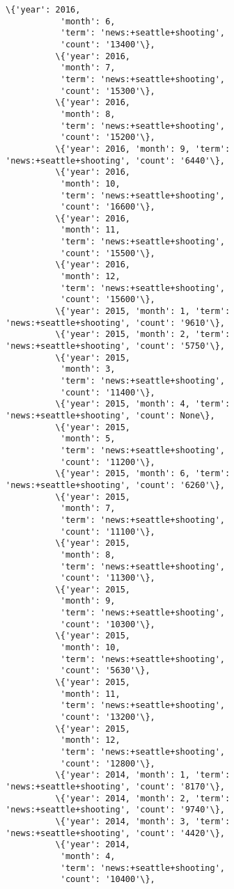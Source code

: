 \documentclass[11pt]{article}
\begin{document}
\begin{Verbatim}[commandchars=\\\{\}]
          \{'year': 2016,
           'month': 6,
           'term': 'news:+seattle+shooting',
           'count': '13400'\},
          \{'year': 2016,
           'month': 7,
           'term': 'news:+seattle+shooting',
           'count': '15300'\},
          \{'year': 2016,
           'month': 8,
           'term': 'news:+seattle+shooting',
           'count': '15200'\},
          \{'year': 2016, 'month': 9, 'term': 'news:+seattle+shooting', 'count': '6440'\},
          \{'year': 2016,
           'month': 10,
           'term': 'news:+seattle+shooting',
           'count': '16600'\},
          \{'year': 2016,
           'month': 11,
           'term': 'news:+seattle+shooting',
           'count': '15500'\},
          \{'year': 2016,
           'month': 12,
           'term': 'news:+seattle+shooting',
           'count': '15600'\},
          \{'year': 2015, 'month': 1, 'term': 'news:+seattle+shooting', 'count': '9610'\},
          \{'year': 2015, 'month': 2, 'term': 'news:+seattle+shooting', 'count': '5750'\},
          \{'year': 2015,
           'month': 3,
           'term': 'news:+seattle+shooting',
           'count': '11400'\},
          \{'year': 2015, 'month': 4, 'term': 'news:+seattle+shooting', 'count': None\},
          \{'year': 2015,
           'month': 5,
           'term': 'news:+seattle+shooting',
           'count': '11200'\},
          \{'year': 2015, 'month': 6, 'term': 'news:+seattle+shooting', 'count': '6260'\},
          \{'year': 2015,
           'month': 7,
           'term': 'news:+seattle+shooting',
           'count': '11100'\},
          \{'year': 2015,
           'month': 8,
           'term': 'news:+seattle+shooting',
           'count': '11300'\},
          \{'year': 2015,
           'month': 9,
           'term': 'news:+seattle+shooting',
           'count': '10300'\},
          \{'year': 2015,
           'month': 10,
           'term': 'news:+seattle+shooting',
           'count': '5630'\},
          \{'year': 2015,
           'month': 11,
           'term': 'news:+seattle+shooting',
           'count': '13200'\},
          \{'year': 2015,
           'month': 12,
           'term': 'news:+seattle+shooting',
           'count': '12800'\},
          \{'year': 2014, 'month': 1, 'term': 'news:+seattle+shooting', 'count': '8170'\},
          \{'year': 2014, 'month': 2, 'term': 'news:+seattle+shooting', 'count': '9740'\},
          \{'year': 2014, 'month': 3, 'term': 'news:+seattle+shooting', 'count': '4420'\},
          \{'year': 2014,
           'month': 4,
           'term': 'news:+seattle+shooting',
           'count': '10400'\},

\end{Verbatim}
\end{document}
